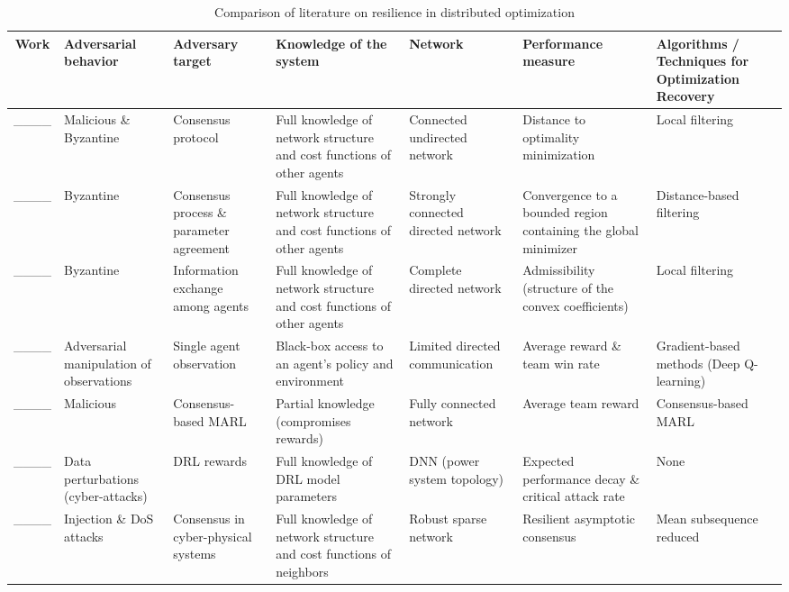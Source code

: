 \begin{table*}[htbp]
  \caption{Comparison of literature on resilience in distributed optimization}
  \centering
  \footnotesize %
  \begin{adjustbox}{width=\textwidth}
    \begin{tabular}{cp{1.5cm}p{1.5cm}p{3.5cm}p{2.5cm}p{2.5cm}p{3cm}}
      \toprule
      \textbf{Work} & \textbf{Adversarial behavior}  & \textbf{Adversary target} & \textbf{Knowledge of the system} & \textbf{Network} & \textbf{Performance measure} & \textbf{Algorithms / Techniques for Optimization Recovery} \\
      \midrule
      ____ & Malicious \& Byzantine \footnotemark[2] & Consensus protocol & Full knowledge of network structure and cost functions of other agents & Connected undirected network & Distance to optimality minimization & Local filtering \\ 
      \midrule
      ____ & Byzantine & Consensus process \& parameter agreement & Full knowledge of network structure and cost functions of other agents & Strongly connected directed network & Convergence to a bounded region containing the global minimizer & Distance-based filtering \\
      \midrule
      ____ & Byzantine & Information exchange among agents & Full knowledge of network structure and cost functions of other agents & Complete directed network & Admissibility (structure of the convex coefficients) & Local filtering \\
      \midrule
      ____ & Adversarial manipulation of observations & Single agent observation & Black-box access to an agent's policy and environment & Limited directed communication & Average reward \& team win rate & Gradient-based methods (Deep Q-learning) \\
      \midrule
      ____ & Malicious & Consensus-based MARL & Partial knowledge (compromises rewards) & Fully connected network & Average team reward & Consensus-based MARL \\
      \midrule
      ____ & Data perturbations (cyber-attacks) & DRL rewards & Full knowledge of DRL model parameters & DNN (power system topology) & Expected performance decay \& critical attack rate & None \\
      \midrule
      ____ & Injection \& DoS attacks & Consensus in cyber-physical systems & Full knowledge of network structure and cost functions of neighbors & Robust sparse network & Resilient asymptotic consensus & Mean subsequence reduced \\

\end{tabular}
\end{adjustbox}
\end{table*}
